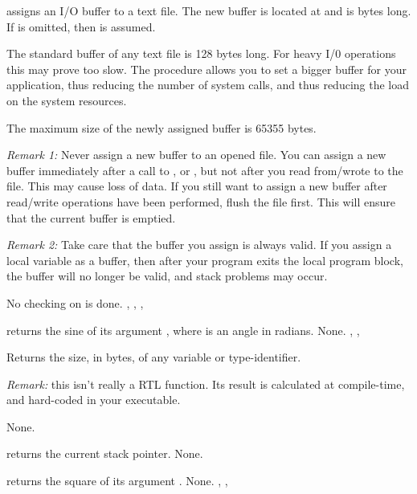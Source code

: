 \documentclass{report}
\begin{document}
{ assigns an I/O buffer to a text file. The new buffer is
located at  and is  bytes long. If  is omitted,
then  is assumed.

The standard buffer of any text file is 128 bytes long. For heavy I/0
operations this may prove too slow. The  procedure allows
you to set a bigger buffer for your application, thus reducing the number of
system calls, and thus reducing the load on the system resources.

The maximum size of the newly assigned buffer is 65355 bytes.

{\em Remark 1:} Never assign a new buffer to an opened file. You can assign a
new buffer immediately after a call to ,  or
, but not after you read from/wrote to the file. This may cause
loss of data. If you still want to assign a new buffer after read/write
operations have been performed, flush the file first. This will ensure that
the current buffer is emptied.

{\em Remark 2:} Take care that the buffer you assign is always valid. If you
assign a local variable as a buffer, then after your program exits the local
program block, the buffer will no longer be valid, and stack problems may
occur.
}
{No checking on  is done.}
{, , , }



{ returns the sine of its argument , where  is an
angle in radians.}
{None.}
{, , }



{ Returns the size, in bytes, of any variable or type-identifier.

 {\em Remark:} this isn't really a RTL function. Its result is calculated at
compile-time, and hard-coded in your executable.}
{None.}
{}



{ returns the current stack pointer.
}{None.}{}



{ returns the square of its argument .}
{None.}
{, , }
\end{document}
